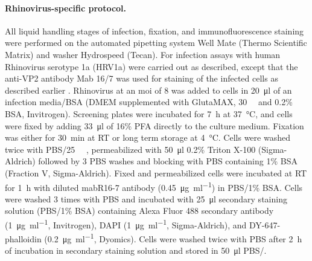 \paragraph{Rhinovirus-specific protocol.}
All liquid handling stages of infection, fixation, and immunofluorescence staining were performed on the automated pipetting system Well Mate (Thermo Scientific Matrix) and washer Hydrospeed (Tecan). For infection assays with human Rhinovirus serotype 1a (HRV1a) were carried out as described, except that the anti-VP2 antibody Mab 16\slash 7 was used for staining of the infected cells as described earlier \citep{Jurgeit2012,Jurgeit2010,Mosser2002}. Rhinovirus at an \gls{moi} of 8 was added to cells in \SI{20}{\micro\litre} of an infection media\slash BSA (DMEM supplemented with GlutaMAX, \SI{30}{\milli\Molar}  and 0.2\% BSA, Invitrogen). Screening plates were incubated for \SI{7}{\hour} at \SI{37}{\celsius}, and cells were fixed by adding \SI{33}{\micro\litre} of 16\% PFA directly to the culture medium. Fixation was either for \SI{30}{\minute} at RT or long term storage at \SI{4}{\celsius}. Cells were washed twice with PBS\slash \SI{25}{\milli\Molar} , permeabilized with \SI{50}{\micro\litre} 0.2\% Triton X-100 (Sigma- Aldrich) followed by 3 PBS washes and blocking with PBS containing 1\% BSA (Fraction V, Sigma-Aldrich). Fixed and permeabilized cells were incubated at RT for \SI{1}{\hour} with diluted mabR16-7 antibody (\SI{0.45}{\micro\gram\per\milli\litre}) in PBS\slash 1\% BSA. Cells were washed 3 times with PBS and incubated with \SI{25}{\micro\litre} secondary staining solution (PBS\slash 1\% BSA) containing Alexa Fluor 488 secondary antibody (\SI{1}{\micro\gram\per\milli\litre}, Invitrogen), DAPI (\SI{1}{\micro\gram\per\milli\litre}, Sigma-Aldrich), and DY-647-phalloidin (\SI{0.2}{\micro\gram\per\milli\litre}, Dyomics). Cells were washed twice with PBS after \SI{2}{\hour} of incubation in secondary staining solution and stored in \SI{50}{\micro\litre} PBS\slash {}.

